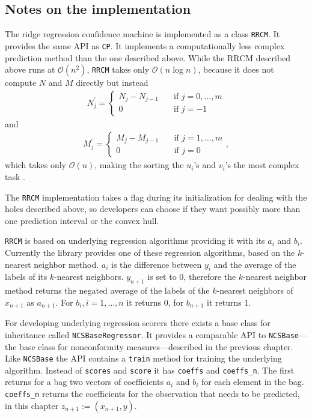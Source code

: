 \documentclass[twoside,11pt]{article}
\begin{document}
\subsection*{Notes on the implementation}

The ridge regression confidence machine is implemented as
a class \texttt{RRCM}. It provides the same API as
\texttt{CP}. It implements a computationally less complex
prediction method than the one described above. While the
RRCM described above runs at $\mathcal{O}(n^2)$,
\texttt{RRCM} takes only $\mathcal{O}(n \log n)$, because it
does not compute $N$ and $M$ directly but instead
\begin{align*}
N_{j}^\prime =
  \begin{cases}
    N_j - N_{j-1} &\quad \text{if } j=0,\dots,m \\
    0             &\quad \text{if } j=-1
  \end{cases}
\end{align*}
and
\begin{align*}
M_{j}^\prime =
  \begin{cases}
    M_j - M_{j-1} &\quad \text{if } j=1,\dots,m \\
    0             &\quad \text{if } j=0
  \end{cases},
\end{align*}
which takes only $\mathcal{O}(n)$, making the sorting the
$u_i$'s and $v_i$'s the most complex task
\citep[see][Chapter 2.3]{alrw}.

The \texttt{RRCM} implementation takes a flag during
its initialization for dealing with the holes described
above, so developers can choose if they want possibly more
than one prediction interval or the convex hull.

\texttt{RRCM} is based on underlying regression algorithms
providing it with its $a_i$ and $b_i$. Currently the
library provides one of these regression algorithms, based
on the $k$-nearest neighbor method.
$a_i$ is the difference between $y_i$ and the average of
the labels of its $k$-nearest neighbors. $y_{n+1}$ is set
to 0, therefore the $k$-nearest neighbor method returns the
negated average of the labels of the $k$-nearest neighbors
of $x_{n+1}$ as $a_{n+1}$.
For $b_i, i=1,\dots,n$ it returns 0, for $b_{n+1}$ it
returns 1.

For developing underlying regression scorers there exists
a base class for inheritance called
\texttt{NCSBaseRegressor}.
It provides a comparable API to \texttt{NCSBase}---the
base class for nonconformity measures---described
in the previous chapter.
Like \texttt{NCSBase} the API contains a \texttt{train}
method for training the underlying algorithm.
Instead of \texttt{scores} and \texttt{score} it has
\texttt{coeffs} and \texttt{coeffs\_n}. The first returns
for a bag two vectors of coefficients $a_i$ and $b_i$ for
each element in the bag. \texttt{coeffs\_n} returns
the coefficients for the observation that needs to be
predicted, in this chapter $z_{n+1} := (x_{n+1},y)$.
\end{document}
